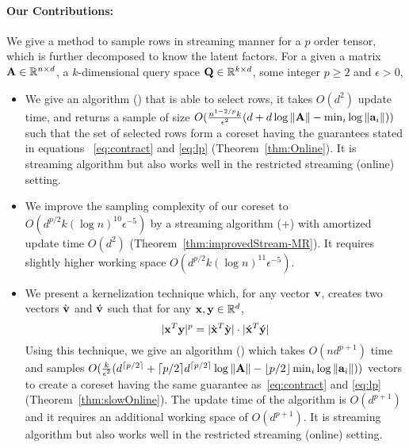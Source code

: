\paragraph{Our Contributions:}
We give a method to sample rows in streaming manner for a $p$ order tensor, which is further decomposed to know the latent factors. For a given a matrix $\mathbf{A} \in \mathbb{R}^{n \times d}$, a $k$-dimensional query space $\mathbf{Q} \in \mathbb{R}^{k \times d}$, some integer $p \geq 2$ and $\epsilon > 0$,
\begin{itemize}
    \item We give an algorithm (\online) that is able to select rows, it takes $O(d^2)$ update time, and returns a sample of size $O(\frac{n^{1-2/p} k}{\epsilon^{2}} (d+d\log\|\mathbf{A}\| - \min_{i}\log\|\mathbf{a}_{i}\|))$ such that the set of selected rows form a coreset having the guarantees stated in equations ~\eqref{eq:contract} and \eqref{eq:lp} (Theorem~\ref{thm:Online}). It is streaming algorithm but also works well in the restricted streaming (online) setting.
    \item We improve the sampling complexity of our coreset to $O(d^{p/2}k(\log n)^{10}\epsilon^{-5})$ by a streaming algorithm (\online+\mrlw) with amortized update time $O(d^2)$ (Theorem~\ref{thm:improvedStream-MR}). It requires slightly higher working space $O(d^{p/2}k(\log n)^{11}\epsilon^{-5})$.
    \item We present a kernelization technique which, for any vector $\mathbf{v}$, creates two vectors $\grave{\mathbf{v}}$ and $\acute{\mathbf{v}}$ such that for any $\mathbf{x}, \mathbf{y} \in \mathbb{R}^{d}$,
    $$|\mathbf{x}^T \mathbf{y}|^p = |\grave{\mathbf{x}}^T \grave{\mathbf{y}}|\cdot|\acute{\mathbf{x}}^T \acute{\mathbf{y}}|$$
    Using this technique, we give an algorithm () which takes $O(nd^{p+1})$ time and samples $O(\frac{k}{\epsilon^{2}} (d^{\lceil p/2 \rceil}+\lceil p/2 \rceil d^{\lceil p/2 \rceil}\log\|\mathbf{A}\| - \lfloor p/2 \rfloor\min_{i}\log\|\mathbf{a}_{i}\|))$ vectors to create a coreset having the same guarantee as~\eqref{eq:contract} and \eqref{eq:lp} (Theorem~\ref{thm:slowOnline}). The update time of the algorithm is $O(d^{p+1})$ and it requires an additional working space of $O(d^{p+1})$. It is streaming algorithm but also works well in the restricted streaming (online) setting.

\end{itemize}
